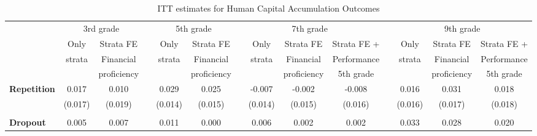 \begin{landscape}

\begin{table}[ht]
\centering
\begin{threeparttable}
\fontsize{9}{10}\selectfont
\caption{ITT estimates for Human Capital Accumulation Outcomes}
\begin{tabular}{lccccccccccccc}
\hline
\hline
           & \multicolumn{ 2}{c}{3rd grade} &            & \multicolumn{ 2}{c}{5th grade} &                    \multicolumn{ 4}{c}{7th grade} &            &       \multicolumn{ 3}{c}{9th grade} \\

           &       Only & Strata FE  &            &       Only & Strata FE  &            &       Only & Strata FE  & Strata FE +  &            &       Only & Strata FE  & Strata FE +  \\

           &     strata &  Financial &            &     strata &  Financial &            &     strata &  Financial & Performance &            &     strata &  Financial & Performance \\

           &            &  proficiency &            &            &  proficiency &            &            &  proficiency &  5th grade &            &            &  proficiency &  5th grade \\
\hline
{\bf Repetition} &      0.017 &      0.010 &            &    0.029 &     0.025 &            &     -0.007 &     -0.002 &     -0.008 &            &      0.016 &     0.031 &      0.018 \\

           &    (0.017) &    (0.019) &            &    (0.014) &    (0.015) &            &    (0.014) &    (0.015) &    (0.016) &            &    (0.016) &    (0.017) &    (0.018) \\

           &            &            &            &            &            &            &            &            &            &            &            &            &            \\

{\bf Dropout} &      0.005 &      0.007 &            &      0.011 &      0.000 &            &      0.006 &      0.002 &      0.002 &            &      0.033 &      0.028 &      0.020 \\


\end{tabular}
\end{threeparttable}
\end{table}
\end{landscape}
